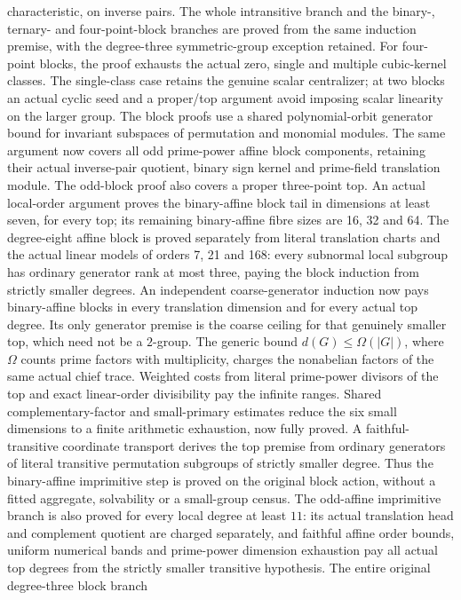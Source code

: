 characteristic, on inverse pairs. The whole intransitive branch and the
binary-, ternary- and four-point-block branches are proved from the same induction
premise, with the degree-three symmetric-group exception retained.
For four-point blocks, the proof exhausts the actual zero, single and
multiple cubic-kernel classes. The single-class case retains the genuine
scalar centralizer; at two blocks an actual cyclic seed and a proper/top
argument avoid imposing scalar linearity on the larger group.
The block proofs use a shared polynomial-orbit generator bound for
invariant subspaces of permutation and monomial modules. The same
argument now covers all odd prime-power affine block components, retaining
their actual inverse-pair quotient, binary sign kernel and prime-field
translation module. The odd-block proof also covers a proper
three-point top. An actual local-order argument proves the binary-affine
block tail in dimensions at least seven, for every top; its remaining
binary-affine fibre sizes are 16, 32 and 64. The degree-eight affine
block is proved separately from literal translation charts and the
actual linear models of orders 7, 21 and 168: every subnormal local
subgroup has ordinary generator rank at most three, paying the
block induction from strictly smaller degrees.
An independent coarse-generator induction now pays binary-affine blocks
in every translation dimension and for every actual top degree. Its only
generator premise is the coarse ceiling for that genuinely smaller top,
which need not be a $2$-group. The generic bound
$d(G)\leq\Omega(|G|)$, where $\Omega$ counts prime factors with
multiplicity, charges the nonabelian factors of the same actual chief
trace. Weighted costs from literal prime-power divisors of the top and
exact linear-order divisibility pay the infinite ranges. Shared
complementary-factor and small-primary estimates reduce the six small
dimensions to a finite arithmetic exhaustion, now fully proved.
A faithful-transitive coordinate transport derives the top premise from
ordinary generators of literal transitive permutation subgroups of
strictly smaller degree. Thus the binary-affine imprimitive step is
proved on the original block action, without a fitted aggregate,
solvability or a small-group census. The odd-affine imprimitive branch
is also proved for every local degree at least $11$: its actual
translation head and complement quotient are charged separately, and
faithful affine order bounds, uniform numerical bands and prime-power
dimension exhaustion pay all actual top degrees from the strictly smaller
transitive hypothesis. The entire original degree-three block branch
